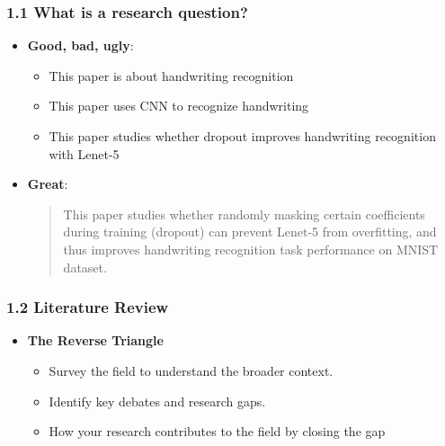 \documentclass{beamer}
\begin{document}
      \begin{frame}
      \frametitle{1.1 What is a research question?}    
      \begin{itemize}
      
      \item<1-> \textbf{Good, bad, ugly}:
      \begin{itemize}
          \item This paper is about handwriting recognition
          \item This paper uses CNN to recognize handwriting
          \item This paper studies whether dropout improves handwriting recognition with Lenet-5
      \end{itemize}
      
      \item<2-> \textbf{Great}:
      
      \begin{quote}
          This paper studies whether randomly masking certain coefficients during training (dropout) can prevent Lenet-5 from overfitting, and thus improves handwriting recognition task performance on MNIST dataset.
      \end{quote}
      
      \end{itemize}
      \end{frame}
      
      
      
      \begin{frame}
      \frametitle{1.2 Literature Review}
      \begin{itemize}[<+->]
          \item \textbf{The Reverse Triangle}
          \begin{itemize}
              \item Survey the field to understand the broader context.
              \item Identify key debates and research gaps.
              \item How your research contributes to the field by closing the gap
          \end{itemize}
      \end{itemize}
      \end{frame}
      
\end{document}
